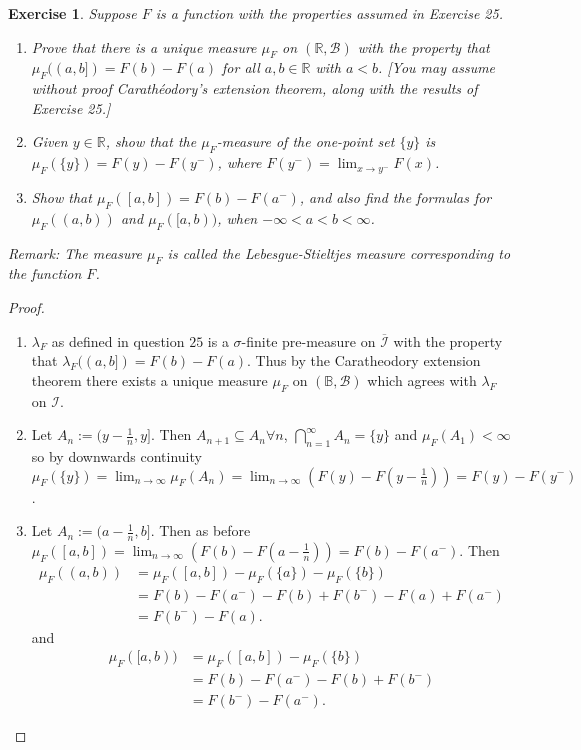 \documentclass{article}
\newtheorem{exercise}[theorem]{Exercise}
\begin{document}
\begin{exercise}
    Suppose $F$ is a function with the properties assumed in Exercise 25.
    \begin{enumerate}
        \item[(a)] Prove that there is a unique measure $\mu_F$ on $(\mathbb{R}, \mathcal{B})$ with the property that $\mu_F((a, b]) = F(b) - F(a)$ for all $a, b \in \mathbb{R}$ with $a < b$. \textit{[You may assume without proof Carathéodory’s extension theorem, along with the results of Exercise 25.]} 
        \item[(b)] Given $y \in \mathbb{R}$, show that the $\mu_F$-measure of the one-point set $\{y\}$ is $\mu_F(\{y\}) = F(y) - F(y^-)$, where $F(y^-) = \lim_{x \to y^-} F(x)$.
        \item[(c)] Show that $\mu_F([a, b]) = F(b) - F(a^-)$, and also find the formulas for $\mu_F((a, b))$ and $\mu_F([a, b))$, when $-\infty < a < b < \infty$.
    \end{enumerate}
    \textit{Remark: The measure $\mu_F$ is called the Lebesgue-Stieltjes measure corresponding to the function $F$.}
\end{exercise}
\begin{proof}
\begin{enumerate}
    \item[(a)] $\lambda_F$ as defined in question $25$ is a $\sigma$-finite pre-measure on $\overline{\mathcal{I}}$ with the property that  $\lambda_F((a,b])=F(b)-F(a)$. Thus by the Caratheodory extension theorem there exists a unique measure $\mu_F$ on $(\mathbb{B},\mathcal{B})$ which agrees with $\lambda_F$ on $\mathcal{I}$.
    \item[(b)] Let $A_n:=(y-\frac{1}{n},y]$. Then $A_{n+1}\subseteq A_n\forall n$, $\bigcap_{n=1}^\infty A_n=\{y\}$ and $\mu_F(A_1)<\infty$ so by downwards continuity $\mu_F(\{y\})=\lim_{n\to\infty}\mu_F(A_n)=\lim_{n\to\infty}(F(y)-F(y-\frac{1}{n}))=F(y)-F(y^-)$.
    \item[(c)] Let $A_n:=(a-\frac{1}{n},b]$. Then as before $\mu_F([a,b])=\lim_{n\to\infty}(F(b)-F(a-\frac{1}{n}))=F(b)-F(a^-)$. Then \begin{align*}\mu_F((a,b))&=\mu_F([a,b])-\mu_F(\{a\})-\mu_F(\{b\})\\&=F(b)-F(a^-)-F(b)+F(b^-)-F(a)+F(a^-)\\&=F(b^-)-F(a).\end{align*} and \begin{align*}
        \mu_F([a,b))&=\mu_F([a,b])-\mu_F(\{b\})\\&=F(b)-F(a^-)-F(b)+F(b^-)\\&=F(b^-)-F(a^-).
    \end{align*}
\end{enumerate}
\end{proof}
\end{document}
